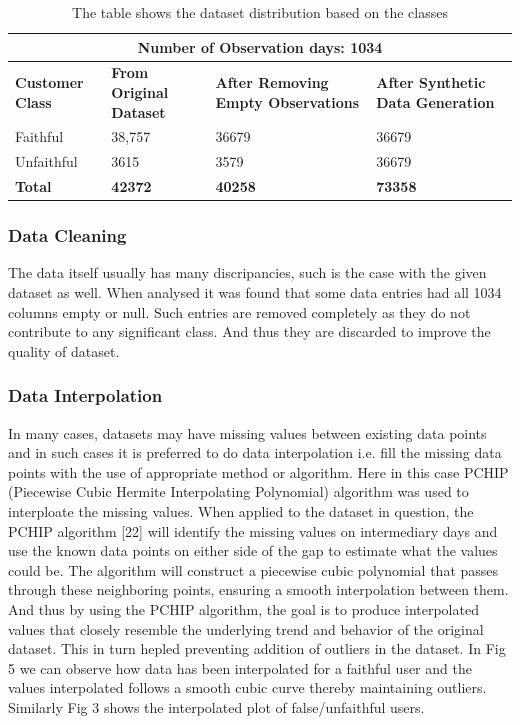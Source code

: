 \documentclass{ieeeaccess}
\begin{document}
\begin{table}[ht]
\centering
\begin{tabular}{|p{1cm}|p{1cm}|p{2.2cm}|p{2.2cm}|}
\hline
\multicolumn{4}{|c|}{Number of Observation days: 1034} \\

\hline
\textbf{Customer Class} & \textbf{From Original Dataset} & \textbf{After Removing Empty Observations} & \textbf{After Synthetic Data Generation} \\
\hline
Faithful & 38,757 & 36679 & 36679 \\
Unfaithful & 3615 & 3579 & 36679 \\
\hline
\hline
\textbf{Total} & \textbf{42372} & \textbf{40258} & \textbf{73358} \\
\hline
\end{tabular}
\caption{The table shows the dataset distribution based on the classes}
\label{tab:template}
\end{table}

\subsubsection{Data Cleaning}
{The data itself usually has many discripancies, such is the case with the given dataset as well. When analysed it was found that some data entries had all 1034 columns empty or null. Such entries are removed completely as they do not contribute to any significant class. And thus they are discarded to improve the quality of dataset.}

\subsubsection{Data Interpolation}
{In many cases, datasets may have missing values between existing data points and in such cases it is preferred to do data interpolation i.e. fill the missing data points with the use of appropriate method or algorithm. Here in this case PCHIP (Piecewise Cubic Hermite Interpolating Polynomial) algorithm was used to interploate the missing values.}
When applied to the dataset in question, the PCHIP algorithm [22] will identify the missing values on intermediary days and use the known data points on either side of the gap to estimate what the values could be. The algorithm will construct a piecewise cubic polynomial that passes through these neighboring points, ensuring a smooth interpolation between them. And thus by using the PCHIP algorithm, the goal is to produce interpolated values that closely resemble the underlying trend and behavior of the original dataset. This in turn hepled preventing addition of outliers in the dataset.
In Fig 5 we can observe how data has been interpolated for a faithful user and the values interpolated follows a smooth cubic curve thereby maintaining outliers. Similarly Fig 3 shows the interpolated plot of false/unfaithful users.
\end{document}
